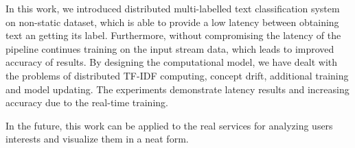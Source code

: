 \label {fs-short-conclusion}

In this work, we introduced distributed multi-labelled text classification system on non-static dataset, which is able to provide a low latency between obtaining text an getting its label. Furthermore, without compromising the latency of the pipeline continues training on the input stream data, which leads to improved accuracy of results. By designing the computational model, we have dealt with the problems of distributed TF-IDF computing, concept drift, additional training and model updating. The experiments demonstrate latency results and increasing accuracy due to the real-time training.

In the future, this work can be applied to the real services for analyzing users interests and visualize them in a neat form.